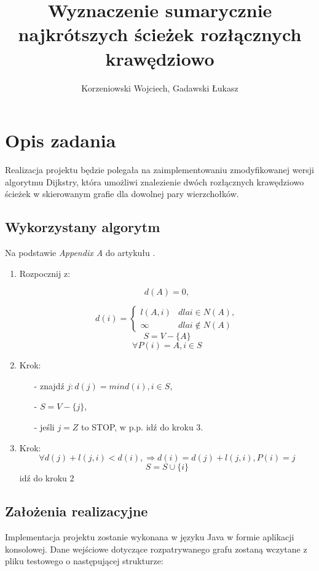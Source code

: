 \documentclass[10pt,a4paper]{article}
\author{Korzeniowski Wojciech, Gadawski Łukasz}
\title{Wyznaczenie sumarycznie najkrótszych ścieżek rozłącznych krawędziowo}
\begin{document}
\maketitle

\section{Opis zadania}
Realizacja projektu będzie polegała na zaimplementowaniu zmodyfikowanej wersji algorytmu Dijkstry, która umożliwi znalezienie dwóch rozłącznych krawędziowo ścieżek w skierowanym grafie dla dowolnej pary wierzchołków.

\subsection{Wykorzystany algorytm}
Na podstawie \textit{Appendix A} do artykułu \cite{telecom}.
\begin{enumerate}
\item Rozpocznij z:

$$
d(A) = 0, 
$$

\[d(i) = \left\{
  \begin{array}{lr}
    l(A, i) & dla i \in N(A),\\
    \infty & dla i \notin N(A)
  \end{array}
\right.
\]
$$
S = V - \{A\}
$$
$$
\forall P(i) = A, i \in S
$$

\item Krok:

\begin{itemize}
\item[-] znajdź $j : d(j) = min d(i), i \in S$,
\item[-] $S = V - \{j\}$,
\item[-] jeśli $j = Z$ to STOP, w p.p. idź do kroku 3.
\end{itemize}

\item Krok:
$$
\forall d(j) + l(j, i) < d(i), \Rightarrow d(i) = d(j) + l(j, i), P(i) = j
$$
$$
S = S \cup \{i\}
$$
idź do kroku 2

\end{enumerate}

\subsection{Założenia realizacyjne}
Implementacja projektu zostanie wykonana w języku Java w formie aplikacji konsolowej. Dane wejściowe dotyczące rozpatrywanego grafu zostaną wczytane z pliku testowego o następującej strukturze:
\end{document}
